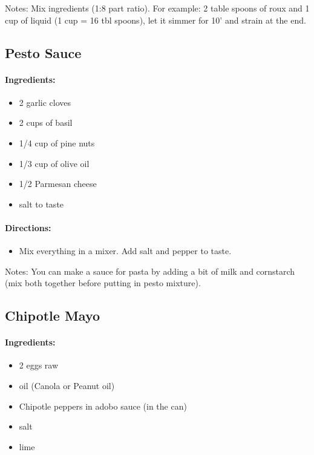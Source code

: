 \documentclass{article}
\begin{document}
Notes: Mix ingredients (1:8 part ratio). For example: 2 table spoons of roux and 1 cup of liquid (1 cup = 16 tbl spoons), let it simmer for 10' and strain at the end.

\subsection{Pesto Sauce}

\paragraph{Ingredients:}

\begin{itemize}
	\item 2 garlic cloves
	\item 2 cups of basil
	\item 1/4 cup of pine nuts
	\item 1/3 cup of olive oil
	\item 1/2 Parmesan cheese
	\item salt to taste
\end{itemize}

\paragraph{Directions:}
\begin{itemize}
	\item Mix everything in a mixer. Add salt and pepper to taste.
\end{itemize}

Notes: You can make a sauce for pasta by adding a bit of milk and cornstarch (mix both together before putting in pesto mixture).

\subsection{Chipotle Mayo}

\paragraph{Ingredients:}

\begin{itemize}
	\item 2 eggs raw
	\item oil (Canola or Peanut oil)
	\item Chipotle peppers in adobo sauce (in the can)
	\item salt
	\item lime
\end{itemize}
\end{document}
